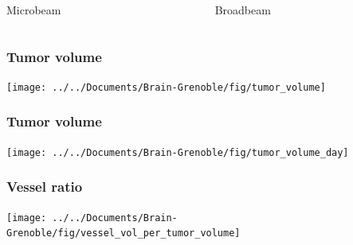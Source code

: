 \documentclass{beamer}					%
\newcommand{\imsize}{\linewidth}
\newlength\imagewidth %
\newlength\imagescale %
\begin{document}
\begin{frame}
\begin{columns}
\begin{column}{0.33\paperwidth}
%
            \centering Microbeam
		\end{column}
		\begin{column}{0.33\paperwidth}
            \pgfmathsetlength{\imagewidth}{\imsize}%
            \def\x{1001}%
            \def\y{978}%
            \centering Broadbeam
		\end{column}
	\end{columns}
\end{frame}

\renewcommand{\imsize}{0.8\textheight}
\begin{frame}
	\frametitle{Tumor volume}
	\texttt{[image: ../../Documents/Brain-Grenoble/fig/tumor\_volume]}
\end{frame}

\begin{frame}
	\frametitle{Tumor volume}
	\texttt{[image: ../../Documents/Brain-Grenoble/fig/tumor\_volume\_day]}
\end{frame}

\begin{frame}
	\frametitle{Vessel ratio}
	\texttt{[image: ../../Documents/Brain-Grenoble/fig/vessel\_vol\_per\_tumor\_volume]}
\end{frame}
\end{document}

